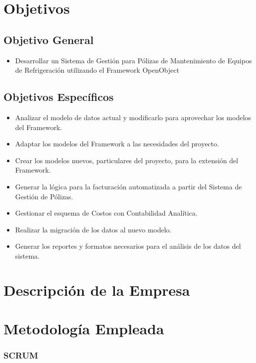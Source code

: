 \documentclass[a4paper, 12pt]{article}
\begin{document}
\section{Objetivos}
\subsection{Objetivo General}
\begin{itemize}
\item Desarrollar un Sistema de Gestión para Pólizas de Mantenimiento de Equipos de Refrigeración utilizando el Framework OpenObject
\end{itemize}

\subsection{Objetivos Específicos}
\begin{itemize}
\item Analizar el modelo de datos actual y modificarlo para aprovechar los modelos del Framework.
\item Adaptar los modelos del Framework a las necesidades del proyecto.
\item Crear los modelos nuevos, particulares del proyecto, para la extensión del Framework.
\item Generar la lógica para la facturación automatizada a partir del Sistema de Gestión de Pólizas.
\item Gestionar el esquema de Costos con Contabilidad Analítica.
\item Realizar la migración de los datos al nuevo modelo.
\item Generar los reportes y formatos necesarios para el análisis de los datos del sistema.
\end{itemize}
\newpage

\section{Descripción de la Empresa}


\newpage

\section{Metodología Empleada}
\subsubsection{SCRUM}
\end{document}
